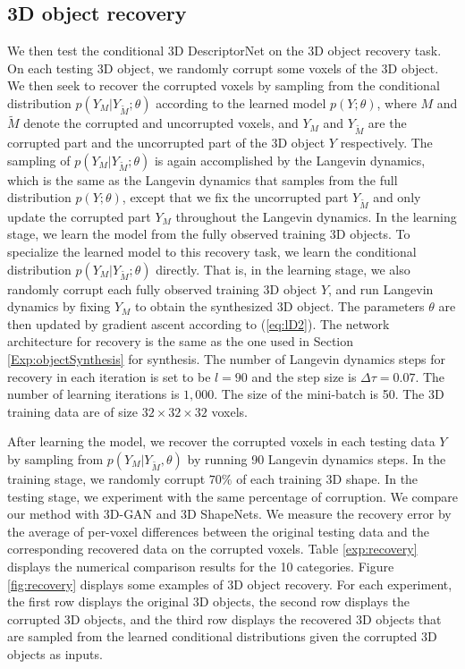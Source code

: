 \documentclass[10pt,twocolumn,letterpaper]{article}
\begin{document}
\subsection{3D object recovery}
\label{Exp:objectRecovery}
We then test the conditional 3D DescriptorNet on the 3D object recovery task.  On each testing 3D object, we randomly corrupt some voxels of the 3D object. We then seek to recover the corrupted voxels by sampling from the conditional distribution $p(Y_M|Y_{\tilde{M}}; \theta)$ according to the learned model $p(Y; \theta)$, where $M$ and $\tilde{M}$ denote the corrupted and uncorrupted voxels, and $Y_M$ and $Y_{\tilde{M}}$ are the corrupted part and the uncorrupted part of the 3D object $Y$ respectively. The sampling of $p(Y_M|Y_{\tilde{M}}; \theta)$ is again accomplished by the Langevin dynamics, which is the same as the Langevin dynamics that samples from the full distribution $p(Y; \theta)$, except that we fix the uncorrupted part $Y_{\tilde{M}}$ and only update the corrupted part $Y_M$ throughout the Langevin dynamics. In the learning stage, we learn the model from the fully observed training 3D objects. To specialize the learned model to this recovery task, we learn the conditional distribution $p(Y_M|Y_{\tilde{M}}; \theta)$ directly. That is, in the learning stage, we also randomly corrupt each fully observed training 3D object $Y$, and run Langevin dynamics by fixing $Y_M$ to obtain the synthesized 3D object. The parameters $\theta$ are then updated by gradient ascent according to (\ref{eq:lD2}). The network architecture for recovery is the same as the one used in Section \ref{Exp:objectSynthesis} for synthesis. The number of Langevin dynamics steps for recovery in each iteration is set to be $l=90$ and the step size is $\Delta \tau =0.07$. The number of learning iterations is $1,000$. The size of the mini-batch is 50. The 3D training data are of size $32 \times 32 \times 32$ voxels. 

 After learning the model, we recover the corrupted voxels in each testing data $Y$ by sampling from $p(Y_M|Y_{\tilde{M}}, \theta)$ by running 90 Langevin dynamics steps. In the training stage, we randomly corrupt $70\%$ of each training 3D shape. In the testing stage, we experiment with the same percentage of corruption. We compare our method with 3D-GAN and 3D ShapeNets.
 We measure the recovery error by the average of per-voxel differences between the original testing data and the corresponding recovered data on the corrupted voxels. Table \ref{exp:recovery} displays the numerical comparison results for the 10 categories. Figure \ref{fig:recovery} displays some examples of 3D object recovery. For each experiment, the first row displays the original 3D objects, the second row displays the corrupted 3D objects, and the third row displays the recovered 3D objects that are sampled from the learned conditional distributions given the corrupted 3D objects as inputs.
 
\end{document}
